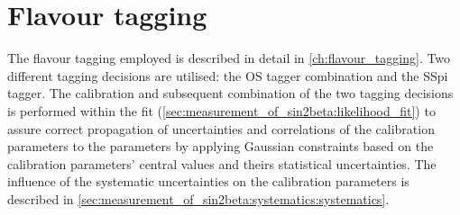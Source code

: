 
\section{Flavour tagging}
\label{sec:measurement_of_sin2beta:flavour_tagging}

The flavour tagging employed is described in detail in
\cref{ch:flavour_tagging}. Two different tagging decisions are utilised: the
\acf{OS} tagger combination and the \acf{SSpi} tagger. The calibration and
subsequent combination of the two tagging decisions is performed within the fit
(\cf \cref{sec:measurement_of_sin2beta:likelihood_fit}) to assure correct
propagation of uncertainties and correlations of the calibration parameters to
the \CP parameters by applying Gaussian constraints based on the calibration
parameters' central values and theirs statistical uncertainties. The influence
of the systematic uncertainties on the calibration parameters is described in
\cref{sec:measurement_of_sin2beta:systematics:systematics}.
